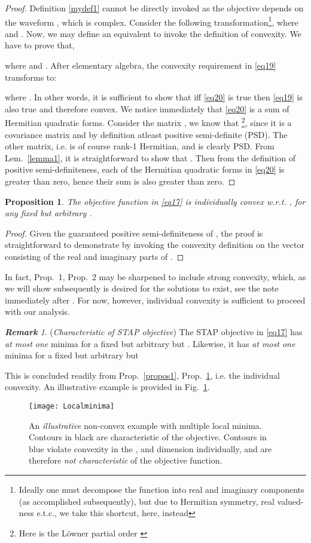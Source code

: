 \documentclass[11pt,draftclsnofoot,onecolumn]{IEEEtran}
\newtheorem{prop}{\bf{Proposition}}
\theoremstyle{definition}
\theoremstyle{remark}
\newtheorem{remk}{\bf Remark}
\begin{document}
\begin{proof}
Definition \ref{mydef1} cannot be directly invoked as the objective  depends on the waveform , which is complex. Consider the following transformation\footnote{Ideally one must decompose the function into real and imaginary components (as accomplished subsequently), but due to Hermitian symmetry, real valued-ness e.t.c., we take this shortcut, here, instead},  where  and . Now, we may  define an equivalent  to invoke the definition of convexity. We have to prove that,

where  and . After elementary algebra, the convexity  requirement in \eqref{eq19} transforms to:


where . In other words, it is sufficient to show that iff \eqref{eq20} is true then \eqref{eq19} is also true and therefore convex. We notice immediately that \eqref{eq20} is a sum of Hermitian quadratic forms. Consider the matrix , we know that \footnote{Here  is the L\"{o}wner partial order \cite{horn1994} }, since it is  a covariance matrix and by definition atleast positive semi-definite (PSD). The other matrix, i.e.  is of course  rank-1 Hermitian, and is clearly PSD. From Lem.~\ref{lemma1}, it is straightforward to show that . Then from the definition of positive semi-definiteness, each of the  Hermitian quadratic forms in \eqref{eq20} is greater than zero, hence their sum is also greater than zero.
\end{proof}
\begin{prop} \label{propos2}
The objective function in \eqref{eq17} is individually convex w.r.t. , for any fixed but arbitrary .
\end{prop}
\begin{proof}
Given the guaranteed positive semi-definiteness of , the proof is straightforward to demonstrate by invoking the convexity definition on the vector consisting of the real and imaginary parts of .
\end{proof}

In fact, Prop.~1, Prop.~2 may be sharpened to include strong convexity, which, as we will show subsequently is desired for the solutions to exist, see the note immediately after .  For now, however, individual convexity is sufficient to proceed with our analysis.

\begin{remk}\label{remarkstapobj} 
({\it Characteristic of STAP objective}) The STAP objective in \eqref{eq17} has {\it at most one} minima for a fixed but arbitrary  but . Likewise, it has {\it at most one} minima for a fixed but arbitrary  but 
\end{remk}
This is concluded readily from Prop.~\ref{propos1}, Prop.~\ref{propos2}, i.e. the individual convexity. An illustrative example is provided in Fig.~\ref{figlocalmin}.
\begin{figure} [htbp!]
\centering
\texttt{[image: Localminima]}
\caption{An {\it illustrative} non-convex example with multiple local minima. Contours in black are characteristic of the objective. Contours in blue violate convexity in the , and  dimension individually, and are therefore {\it not characteristic} of the objective function.}
\label{figlocalmin}
\end{figure}
\end{document}
